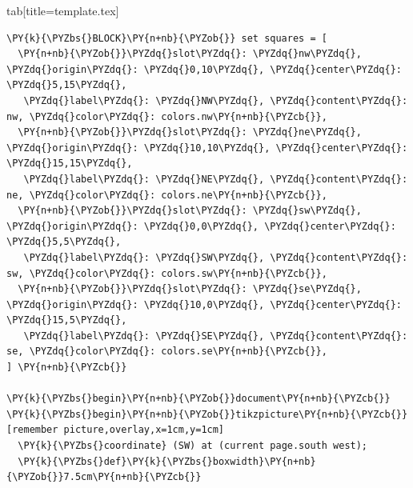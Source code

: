 \documentclass[a4paper,twoside]{article}
\begin{document}
\begin{tsdiv}{tab}[title=template.tex]
\begin{tscode}[lang=tex, engine=pygments]
\begin{Verbatim}[commandchars=\\\{\},breaklines, breakanywhere, commandchars=\\\{\}]
\PY{k}{\PYZbs{}BLOCK}\PY{n+nb}{\PYZob{}} set squares = [
  \PY{n+nb}{\PYZob{}}\PYZdq{}slot\PYZdq{}: \PYZdq{}nw\PYZdq{}, \PYZdq{}origin\PYZdq{}: \PYZdq{}0,10\PYZdq{}, \PYZdq{}center\PYZdq{}: \PYZdq{}5,15\PYZdq{},
   \PYZdq{}label\PYZdq{}: \PYZdq{}NW\PYZdq{}, \PYZdq{}content\PYZdq{}: nw, \PYZdq{}color\PYZdq{}: colors.nw\PY{n+nb}{\PYZcb{}},
  \PY{n+nb}{\PYZob{}}\PYZdq{}slot\PYZdq{}: \PYZdq{}ne\PYZdq{}, \PYZdq{}origin\PYZdq{}: \PYZdq{}10,10\PYZdq{}, \PYZdq{}center\PYZdq{}: \PYZdq{}15,15\PYZdq{},
   \PYZdq{}label\PYZdq{}: \PYZdq{}NE\PYZdq{}, \PYZdq{}content\PYZdq{}: ne, \PYZdq{}color\PYZdq{}: colors.ne\PY{n+nb}{\PYZcb{}},
  \PY{n+nb}{\PYZob{}}\PYZdq{}slot\PYZdq{}: \PYZdq{}sw\PYZdq{}, \PYZdq{}origin\PYZdq{}: \PYZdq{}0,0\PYZdq{}, \PYZdq{}center\PYZdq{}: \PYZdq{}5,5\PYZdq{},
   \PYZdq{}label\PYZdq{}: \PYZdq{}SW\PYZdq{}, \PYZdq{}content\PYZdq{}: sw, \PYZdq{}color\PYZdq{}: colors.sw\PY{n+nb}{\PYZcb{}},
  \PY{n+nb}{\PYZob{}}\PYZdq{}slot\PYZdq{}: \PYZdq{}se\PYZdq{}, \PYZdq{}origin\PYZdq{}: \PYZdq{}10,0\PYZdq{}, \PYZdq{}center\PYZdq{}: \PYZdq{}15,5\PYZdq{},
   \PYZdq{}label\PYZdq{}: \PYZdq{}SE\PYZdq{}, \PYZdq{}content\PYZdq{}: se, \PYZdq{}color\PYZdq{}: colors.se\PY{n+nb}{\PYZcb{}},
] \PY{n+nb}{\PYZcb{}}

\PY{k}{\PYZbs{}begin}\PY{n+nb}{\PYZob{}}document\PY{n+nb}{\PYZcb{}}
\PY{k}{\PYZbs{}begin}\PY{n+nb}{\PYZob{}}tikzpicture\PY{n+nb}{\PYZcb{}}[remember picture,overlay,x=1cm,y=1cm]
  \PY{k}{\PYZbs{}coordinate} (SW) at (current page.south west);
  \PY{k}{\PYZbs{}def}\PY{k}{\PYZbs{}boxwidth}\PY{n+nb}{\PYZob{}}7.5cm\PY{n+nb}{\PYZcb{}}


\end{Verbatim}
\end{tscode}
\end{tsdiv}
\end{document}
